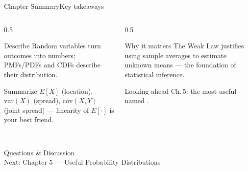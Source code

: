 \documentclass[aspectratio=169,11pt]{beamer}
\begin{document}
\begin{frame}{Chapter Summary}{Key takeaways}
  \begin{columns}[T]
    \begin{column}{0.5\textwidth}
      \begin{block}{Describe}
        \small Random variables turn outcomes into numbers; PMFs/PDFs and
        CDFs describe their distribution.
      \end{block}
      \begin{exampleblock}{Summarize}
        \small $E[X]$ (location), $\text{var}(X)$ (spread),
        $\text{cov}(X,Y)$ (joint spread) — linearity of $E[\cdot]$ is your
        best friend.
      \end{exampleblock}
    \end{column}
    \begin{column}{0.5\textwidth}
      \begin{alertblock}{Why it matters}
        \small The Weak Law justifies using sample averages to estimate
        unknown means — the foundation of statistical inference.
      \end{alertblock}
      \begin{block}{Looking ahead}
        \small Ch.\,5: the most useful named .
      \end{block}
    \end{column}
  \end{columns}
\end{frame}

{
\begin{frame}
  \vfill
  \begin{center}
    {\LARGE\textcolor{white}{\textbf{Thank you!}}}\\[0.6em]
    {\small\textcolor{PrimaryLight}{Questions \& Discussion}}\\[1.2em]
    {\footnotesize\textcolor{AccentYellow}{Next: Chapter 5 — Useful Probability Distributions}}
  \end{center}
  \vfill
\end{frame}}
\end{document}
